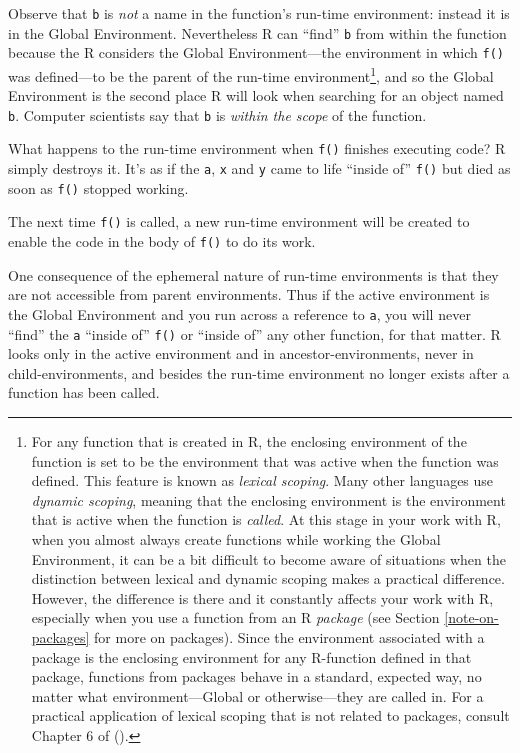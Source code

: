 \documentclass[]{book}
\let\rmarkdownfootnote\footnote%
\def\footnote{\protect\rmarkdownfootnote}
\theoremstyle{definition}
\theoremstyle{definition}
\theoremstyle{definition}
\theoremstyle{remark}
\begin{document}
{Observe that \texttt{b} is \emph{not} a name in the function's run-time
environment: instead it is in the Global Environment. Nevertheless R can
``find'' \texttt{b} from within the function because the R considers the
Global Environment---the environment in which \texttt{f()} was
defined---to be the parent of the run-time environment\footnote{For any
  function that is created in R, the enclosing environment of the
  function is set to be the environment that was active when the
  function was defined. This feature is known as \emph{lexical scoping}.
  Many other languages use \emph{dynamic scoping}, meaning that the
  enclosing environment is the environment that is active when the
  function is \emph{called}. At this stage in your work with R, when you
  almost always create functions while working the Global Environment,
  it can be a bit difficult to become aware of situations when the
  distinction between lexical and dynamic scoping makes a practical
  difference. However, the difference is there and it constantly affects
  your work with R, especially when you use a function from an R
  \emph{package} (see Section \ref{note-on-packages} for more on
  packages). Since the environment associated with a package is the
  enclosing environment for any R-function defined in that package,
  functions from packages behave in a standard, expected way, no matter
  what environment---Global or otherwise---they are called in. For a
  practical application of lexical scoping that is not related to
  packages, consult Chapter 6 of (\citet{Grolemund2014}).}, and so the
Global Environment is the second place R will look when searching for an
object named \texttt{b}. Computer scientists say that \texttt{b} is
\emph{within the scope}  of the function.

What happens to the run-time environment when \texttt{f()} finishes
executing code? R simply destroys it. It's as if the \texttt{a},
\texttt{x} and \texttt{y} came to life ``inside of'' \texttt{f()} but
died as soon as \texttt{f()} stopped working.

The next time \texttt{f()} is called, a new run-time environment will be
created to enable the code in the body of \texttt{f()} to do its work.

One consequence of the ephemeral nature of run-time environments is that
they are not accessible from parent environments. Thus if the active
environment is the Global Environment and you run across a reference to
\texttt{a}, you will never ``find'' the \texttt{a} ``inside of''
\texttt{f()} or ``inside of'' any other function, for that matter. R
looks only in the active environment and in ancestor-environments, never
in child-environments, and besides the run-time environment no longer
exists after a function has been called.

}
\end{document}
